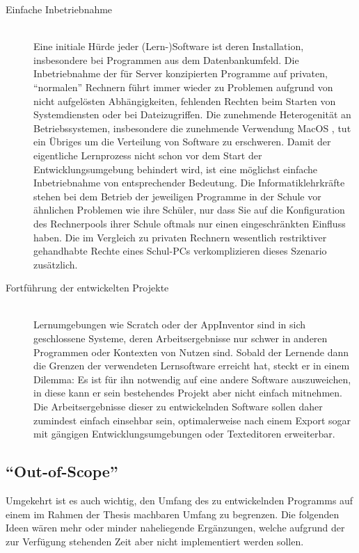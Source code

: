 \begin{description}
\item[Einfache Inbetriebnahme] \hfill \\
  Eine initiale Hürde jeder (Lern-)Software ist deren Installation, insbesondere bei Programmen aus dem Datenbankumfeld. Die Inbetriebnahme der für Server konzipierten Programme auf privaten, ``normalen'' Rechnern führt immer wieder zu Problemen aufgrund von nicht aufgelösten Abhängigkeiten, fehlenden Rechten beim Starten von Systemdiensten oder bei Dateizugriffen. Die zunehmende Heterogenität an Betriebssystemen, insbesondere die zunehmende Verwendung MacOS \cite{statista-os-verbreitung}, tut ein Übriges um die Verteilung von Software zu erschweren. Damit der eigentliche Lernprozess nicht schon vor dem Start der Entwicklungsumgebung behindert wird, ist eine möglichst einfache Inbetriebnahme von entsprechender Bedeutung. Die Informatiklehrkräfte stehen bei dem Betrieb der jeweiligen Programme in der Schule vor ähnlichen Problemen wie ihre Schüler, nur dass Sie auf die Konfiguration des Rechnerpools ihrer Schule oftmals nur einen eingeschränkten Einfluss haben. Die im Vergleich zu privaten Rechnern wesentlich restriktiver gehandhabte Rechte eines Schul-PCs verkomplizieren dieses Szenario zusätzlich.
\item[Fortführung der entwickelten Projekte] \hfill \\
  Lernumgebungen wie Scratch oder der AppInventor sind in sich geschlossene Systeme, deren Arbeitsergebnisse nur schwer in anderen Programmen oder Kontexten von Nutzen sind. Sobald der Lernende dann die Grenzen der verwendeten Lernsoftware erreicht hat, steckt er in einem Dilemma: Es ist für ihn notwendig auf eine andere Software auszuweichen, in diese kann er sein bestehendes Projekt aber nicht einfach mitnehmen. Die Arbeitsergebnisse dieser zu entwickelnden Software sollen daher zumindest einfach einsehbar sein, optimalerweise nach einem Export sogar mit gängigen Entwicklungsumgebungen oder Texteditoren erweiterbar.
  
  
\end{description}

\subsection{``Out-of-Scope''}
\label{sec:out-of-scope}

Umgekehrt ist es auch wichtig, den Umfang des zu entwickelnden Programms auf einem im Rahmen der Thesis machbaren Umfang zu begrenzen. Die folgenden Ideen wären mehr oder minder naheliegende Ergänzungen, welche aufgrund der zur Verfügung stehenden Zeit aber nicht implementiert werden sollen.

